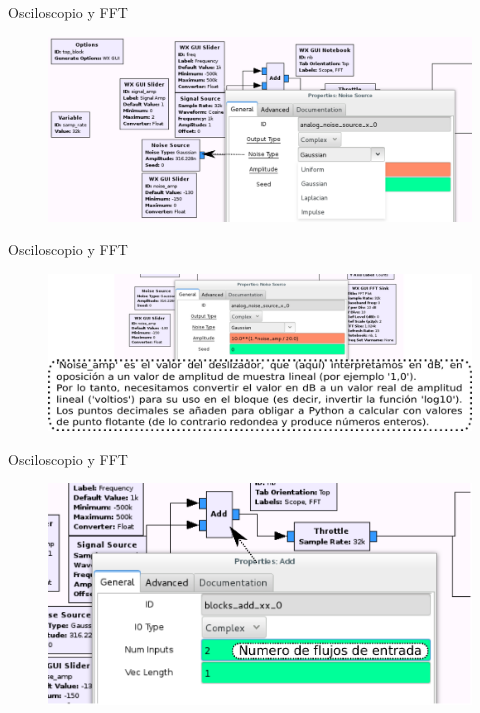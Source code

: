 \begin{frame}{Osciloscopio y FFT}
\begin{figure}[H]
\centering
\includegraphics[width=1.055\textwidth]{lab2/pdf/lab2_3.pdf}
\end{figure}
\end{frame}

\begin{frame}{Osciloscopio y FFT}
\begin{figure}[H]
\centering
\includegraphics[width=1.055\textwidth]{lab2/pdf/lab2_4.pdf}
\end{figure}
\end{frame}

\begin{frame}{Osciloscopio y FFT}
\begin{figure}[H]
\centering
\includegraphics[width=\textwidth]{lab2/pdf/lab2_5.pdf}
\end{figure}
\end{frame}

